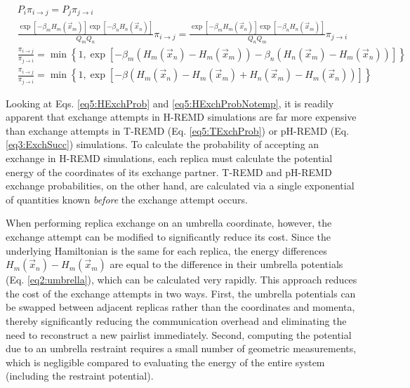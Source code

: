 \begin{align}
   & P_{i} \pi_{i \rightarrow j} = P_{j} \pi_{j \rightarrow i} \nonumber \\
   & \frac {\exp \left[ -\beta_m H_m(\vec{x}_m) \right] \exp \left[ -\beta_n
         H_n(\vec{x}_n) \right]} {Q_m Q_n} \pi_{i \rightarrow j} = \frac {\exp
         \left[ -\beta_m H_m(\vec{x}_n) \right] \exp \left[ -\beta_n
         H_n(\vec{x}_m) \right]} {Q_n Q_m} \pi_{j \rightarrow i} \nonumber \\
   & \frac {\pi_{i \rightarrow j}} {\pi_{j \rightarrow i}} = \min \left \lbrace
         1, \exp \left[ -\beta_m \left( H_m(\vec{x}_n) - H_m(\vec{x}_m) \right)
         - \beta_n \left( H_n(\vec{x}_m) - H_m(\vec{x}_n) \right) \right] \right
           \rbrace \label{eq5:HExchProb} \\
   & \frac {\pi_{i \rightarrow j}} {\pi_{j \rightarrow i}} = \min \left \lbrace
         1, \exp \left[ -\beta \left( H_m(\vec{x}_n) - H_m(\vec{x}_m) +
         H_n(\vec{x}_m) - H_m(\vec{x}_n) \right) \right] \right \rbrace
   \label{eq5:HExchProbNotemp}
\end{align}

Looking at Eqs. \ref{eq5:HExchProb} and \ref{eq5:HExchProbNotemp}, it is readily
apparent that exchange attempts in H-REMD simulations are far more expensive
than exchange attempts in T-REMD (Eq. \ref{eq5:TExchProb}) or pH-REMD (Eq.
\ref{eq3:ExchSucc}) simulations. To calculate the probability of accepting an
exchange in H-REMD simulations, each replica must calculate the potential energy
of the coordinates of its exchange partner. T-REMD and pH-REMD exchange
probabilities, on the other hand, are calculated via a single exponential of
quantities known \emph{before} the exchange attempt occurs.

When performing replica exchange on an umbrella coordinate, however, the
exchange attempt can be modified to significantly reduce its cost. Since the
underlying Hamiltonian is the same for each replica, the energy differences
$H_m(\vec{x}_n) - H_m(\vec{x}_m)$ are equal to the difference in their umbrella
potentials (Eq. \ref{eq2:umbrella}), which can be calculated very rapidly. This
approach reduces the cost of the exchange attempts in two ways. First, the
umbrella potentials can be swapped between adjacent replicas rather than the
coordinates and momenta, thereby significantly reducing the communication
overhead and eliminating the need to reconstruct a new pairlist immediately.
Second, computing the potential due to an umbrella restraint requires a small
number of geometric measurements, which is negligible compared to evaluating the
energy of the entire system (including the restraint potential).

